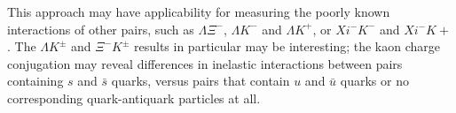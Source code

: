  




This approach may have applicability for measuring the poorly known interactions of other pairs, such as $\Lambda\Xi^-$, $\Lambda K^-$ and $\Lambda K^+$, or $Xi^-K^-$ and $Xi^-K+$.
The $\Lambda K^\pm$ and $\Xi^-K^\pm$ results in particular may be interesting; the kaon charge conjugation may reveal differences in inelastic interactions between pairs containing $s$ and $\bar{s}$ quarks, versus pairs that contain $u$ and $\bar{u}$ quarks or no corresponding quark-antiquark particles at all.

